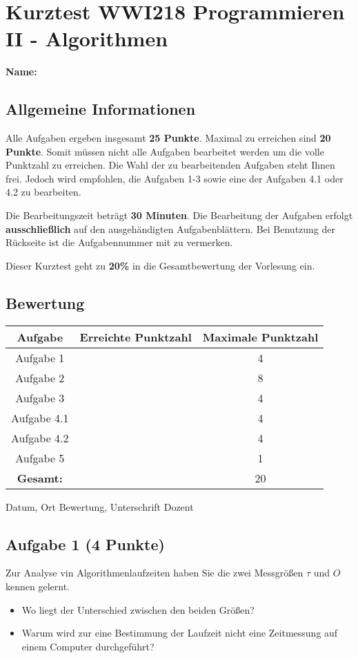 \documentclass[a4paper,
			   fontsize=12pt]{article}
\begin{document}
\section*{Kurztest WWI218 Programmieren II - Algorithmen}
\textbf{Name:} 
\vspace{0,5cm}
\subsection*{Allgemeine Informationen}
Alle Aufgaben ergeben insgesamt \textbf{25 Punkte}. Maximal zu erreichen sind \textbf{20 Punkte}. Somit müssen nicht alle Aufgaben bearbeitet werden um die volle Punktzahl zu erreichen.
Die Wahl der zu bearbeitenden Aufgaben steht Ihnen frei. Jedoch wird empfohlen, die Aufgaben 1-3 sowie eine der Aufgaben 4.1 oder 4.2 zu bearbeiten.

Die Bearbeitungszeit beträgt \textbf{30 Minuten}. Die Bearbeitung der Aufgaben erfolgt \textbf{ausschließlich} auf den ausgehändigten Aufgabenblättern. Bei Benutzung der Rückseite ist die Aufgabennummer mit zu vermerken.

Dieser Kurztest geht zu \textbf{20\%} in die Gesamtbewertung der Vorlesung ein.

\subsection*{Bewertung}
\begin{tabular}{|c|c|c|}
\hline
\textbf{Aufgabe}&\textbf{Erreichte Punktzahl}&\textbf{Maximale Punktzahl}\\
\hline
Aufgabe 1 & & 4
\\\hline
Aufgabe 2 & & 8
\\\hline
Aufgabe 3 & & 4
\\\hline
Aufgabe 4.1 & & 4
\\\hline
Aufgabe 4.2 & & 4
\\\hline
Aufgabe 5 & & 1
\\\hline
\textbf{Gesamt:} & & 20
\\\hline
\end{tabular}

\vspace{2cm}
\hline


\small{Datum, Ort \hspace{8cm} Bewertung, Unterschrift Dozent}

\newpage

\subsection*{Aufgabe 1 (4 Punkte)}
Zur Analyse vin Algorithmenlaufzeiten haben Sie die zwei Messgrößen $\tau$ und $O$ kennen gelernt.
\begin{itemize}
    \item Wo liegt der Unterschied zwischen den beiden Größen?
    \item Warum wird zur eine Bestimmung der Laufzeit nicht eine Zeitmessung auf einem Computer durchgeführt?
\end{itemize}
\end{document}
